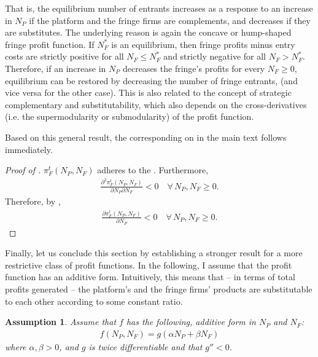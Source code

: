\documentclass[a4paper]{article}
\newtheorem{assumption}{Assumption}
\begin{document}
That is, the equilibrium number of entrants increases as a response to an increase in $N_P$ if the platform and the fringe firms are complements, and decreases if they are substitutes.
The underlying reason is again the concave or hump-shaped fringe profit function.
If $N_F^*$ is an equilibrium, then fringe profits minus entry costs are strictly positive for all $N_F \leq N_F^*$ and strictly negative for all $N_F > N_F^*$.
Therefore, if an increase in $N_P$ decreases the fringe's profits for every $N_F \geq 0$, equilibrium can be restored by decreasing the number of fringe entrants, (and vice versa for the other case).
This is also related to the concept of strategic complementary and substitutability, which also depends on the cross-derivatives (i.e. the supermodularity or submodularity) of the profit function.

Based on this general result, the corresponding on in the main text follows immediately.
\begin{proof}[Proof of ]
    $\pi^t_F(N_P ,N_F)$ adheres to the .
    Furthermore, 
    \begin{align*}
        \frac{\partial^2 \pi^t_F(N_P ,N_F)}{\partial N_P \partial N_F} < 0 \quad \forall\, N_P, N_F \geq 0.
    \end{align*}
    Therefore, by ,
    \begin{align*}
        \frac{\partial \pi^t_F(N_P, N_F)}{\partial N_P} < 0 \quad \forall\, N_P, N_F \geq 0.
    \end{align*}
\end{proof}

Finally, let us conclude this section by establishing a stronger result for a more restrictive class of profit functions.
In the following, I assume that the profit function has an additive form.
Intuitively, this means that -- in terms of total profits generated -- the platform's and the fringe firms' products are substitutable to each other according to some constant ratio.
\begin{assumption}
    \label{ass:additive_profit}
    Assume that $f$ has the following, additive form in $N_P$ and $N_F$:
    \begin{align*}
        f(N_P, N_F) = g(\alpha N_P + \beta N_F)
    \end{align*}
    where $\alpha, \beta > 0$, and $g$ is twice differentiable and that $g'' < 0$.
\end{assumption}
\end{document}
